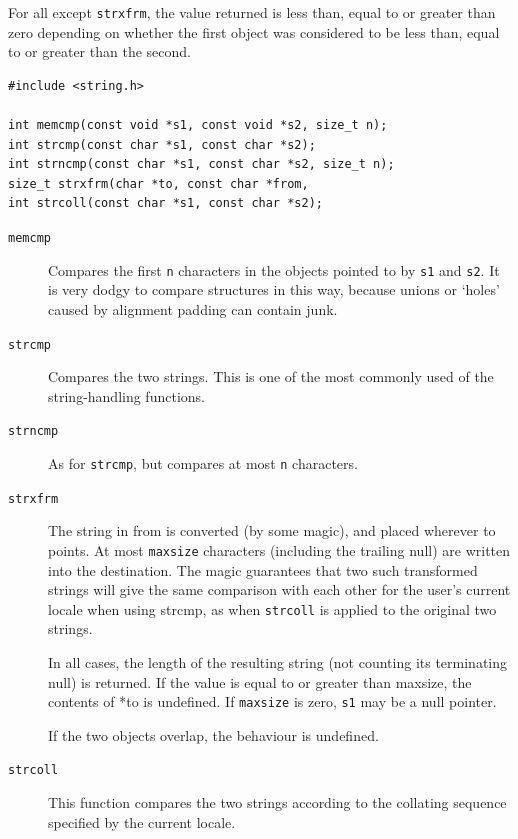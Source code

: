    For all except \texttt{strxfrm}, the value returned is less than,
    equal to or greater than zero depending on whether the first object was
    considered to be less than, equal to or greater than the second.


   \begin{Verbatim}
#include <string.h>

int memcmp(const void *s1, const void *s2, size_t n);
int strcmp(const char *s1, const char *s2);
int strncmp(const char *s1, const char *s2, size_t n);
size_t strxfrm(char *to, const char *from,
int strcoll(const char *s1, const char *s2);
\end{Verbatim}

   \begin{description}
    \item[\texttt{memcmp}] Compares the first \texttt{n} characters in the objects pointed to
     by  \texttt{s1} and \texttt{s2}.  It is very dodgy to compare
     structures in this way, because unions or `holes' caused  by
     alignment padding can contain junk.

    \item[\texttt{strcmp}] Compares the two  strings.   This  is  one  of  the  most commonly used
     of the string-handling functions.

    \item[\texttt{strncmp}] As for \texttt{strcmp}, but compares at most \texttt{n}
     characters.

    \item[\texttt{strxfrm}] 
     The string in from is  converted  (by  some  magic),  and placed
      wherever  to  points.  At most \texttt{maxsize} characters (including
      the  trailing  null)  are  written  into  the destination.    The   magic
      guarantees  that  two  such transformed strings will give the  same
      comparison  with each  other  for  the  user's  current  locale when
      using strcmp, as when \texttt{strcoll} is applied to  the  original
      two strings.


     In all cases, the length of  the  resulting  string  (not counting its
      terminating null) is returned.  If the value is equal to or greater than
      maxsize, the contents of  *to is  undefined.   If  \texttt{maxsize}
      is  zero,  \texttt{s1} may be a null pointer.


     If the two objects overlap, the behaviour is undefined.

    

    \item[\texttt{strcoll}] This function compares the two strings according  to  the
     collating sequence specified by the current locale.
   \end{description}

